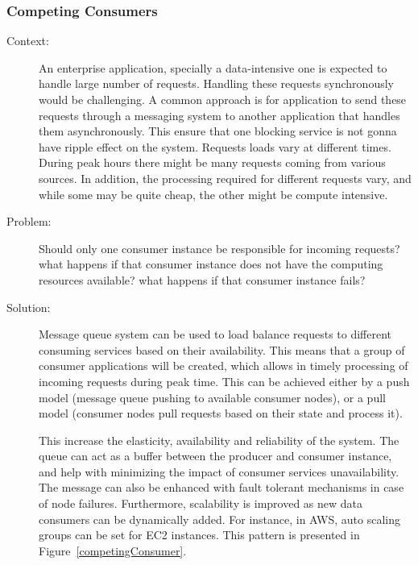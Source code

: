 \documentclass{bmcart}
\begin{document}
\subsubsection{Competing Consumers}

\begin{description}
  \item[Context:] An enterprise application, specially a data-intensive one is expected to handle large number of requests. Handling these requests synchronously would be challenging. A common approach is for application to send these requests through a messaging system to another application that handles them asynchronously. This ensure that one blocking service is not gonna have ripple effect on the system. Requests loads vary at different times. During peak hours there might be many requests coming from various sources. In addition, the processing required for different requests vary, and while some may be quite cheap, the other might be compute intensive. 
  \item[Problem:] Should only one consumer instance be responsible for incoming requests? what happens if that consumer instance does not have the computing resources available? what happens if that consumer instance fails? 
  \item[Solution:] Message queue system can be used to load balance requests to different consuming services based on their availability. This means that a group of consumer applications will be created, which allows in timely processing of incoming requests during peak time. This can be achieved either by a push model (message queue pushing to available consumer nodes), or a pull model (consumer nodes pull requests based on their state and process it).

  This increase the elasticity, availability and reliability of the system. The queue can act as a buffer between the producer and consumer instance, and help with minimizing the impact of consumer services unavailability. The message can also be enhanced with fault tolerant mechanisms in case of node failures. Furthermore, scalability is improved as new data consumers can be dynamically added. For instance, in AWS, auto scaling groups can be set for EC2 instances. This pattern is presented in Figure~\ref{competingConsumer}.  
\end{description}

\end{document}
